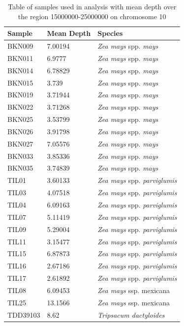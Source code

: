 \begin{table}
\begin{center}
	\begin{tabular} { | p{5cm} | p{5cm} | p{5cm} | }
	\hline
	\textbf{Sample} & \textbf{Mean Depth} & \textbf{Species} \\ \hline \hline
	BKN009 & 7.00194 & {\it Zea mays} spp. {\it mays}\\ \hline
	BKN011 & 6.9777  & {\it Zea mays} spp. {\it mays}\\ \hline
	BKN014 & 6.78829 & {\it Zea mays} spp. {\it mays} \\ \hline
	BKN015 & 3.739 & {\it Zea mays} spp. {\it mays} \\ \hline
	BKN019 & 3.71944 & {\it Zea mays} spp. {\it mays} \\ \hline
	BKN022 & 3.71268 & {\it Zea mays} spp. {\it mays} \\ \hline
	BKN025 & 3.53799 & {\it Zea mays} spp. {\it mays} \\ \hline
	BKN026 & 3.91798 & {\it Zea mays} spp. {\it mays} \\ \hline
	BKN027 & 7.05576 & {\it Zea mays} spp. {\it mays} \\ \hline
	BKN033 & 3.85336 & {\it Zea mays} spp. {\it mays} \\ \hline
	BKN035 & 3.74839 & {\it Zea mays} spp. {\it mays} \\ \hline
	TIL01 & 3.60133 & {\it Zea mays} spp. {\it parviglumis}\\ \hline
	TIL03 & 4.07518 & {\it Zea mays} spp. {\it parviglumis} \\ \hline
	TIL04 & 6.09163 & {\it Zea mays} spp. {\it parviglumis} \\ \hline
	TIL07 & 5.11419 & {\it Zea mays} spp. {\it parviglumis} \\ \hline
	TIL09 & 5.29004 & {\it Zea mays} spp. {\it parviglumis} \\ \hline
	TIL11 & 3.15477 & {\it Zea mays} spp. {\it parviglumis} \\ \hline
	TIL15 & 6.87873 & {\it Zea mays} spp. {\it parviglumis} \\ \hline
	TIL16 & 2.67186 & {\it Zea mays} spp. {\it parviglumis} \\ \hline
	TIL17 & 2.61892 & {\it Zea mays} spp. {\it parviglumis} \\ \hline
	TIL08 & 6.09453 & \textit{Zea mays} ssp. {mexicana} \\ \hline
	TIL25 & 13.1566 & \textit{Zea mays} ssp. {mexicana} \\ \hline
	TDD39103 & 8.62 & \textit{Tripsacum dactyloides} \\ \hline
	\end{tabular}
	\caption{Table of samples used in analysis with mean depth over the region 15000000-25000000 on chromosome 10}
	\label{tab:samples}
	\end{center}
\end{table}